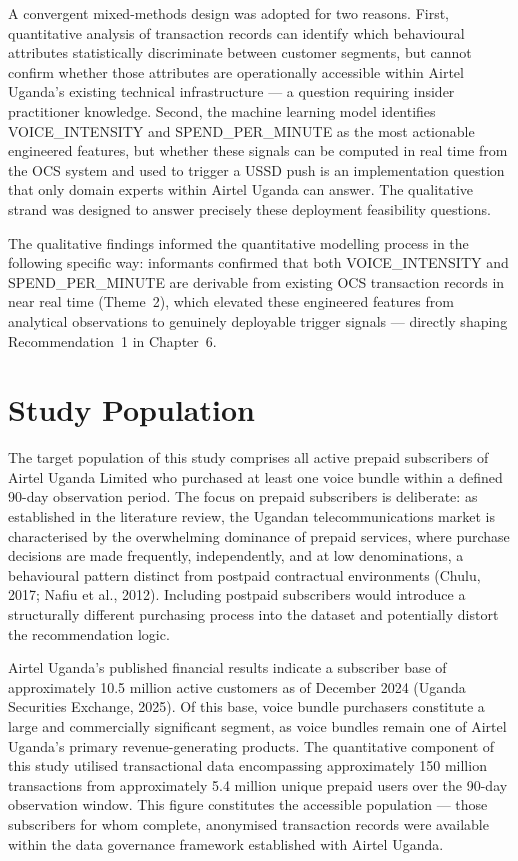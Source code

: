 A convergent mixed-methods design was adopted \cite{ref17} for two reasons.
First, quantitative analysis of transaction records can identify which behavioural
attributes statistically discriminate between customer segments, but cannot confirm
whether those attributes are operationally accessible within Airtel Uganda's
existing technical infrastructure --- a question requiring insider practitioner
knowledge. Second, the machine learning model identifies VOICE\_INTENSITY and
SPEND\_PER\_MINUTE as the most actionable engineered features, but whether these
signals can be computed in real time from the OCS system and used to trigger a
USSD push is an implementation question that only domain experts within Airtel
Uganda can answer. The qualitative strand was designed to answer precisely these
deployment feasibility questions.

The qualitative findings informed the quantitative modelling process in the
following specific way: informants confirmed that both VOICE\_INTENSITY and
\\SPEND\_PER\_MINUTE are derivable from existing OCS transaction records in near
real time (Theme~2), which elevated these engineered features from analytical
observations to genuinely deployable trigger signals --- directly shaping
Recommendation~1 in Chapter~6.

\section{Study Population}

The target population of this study comprises all active prepaid subscribers of Airtel Uganda Limited who purchased at least one voice bundle within a defined 90-day observation period. The focus on prepaid subscribers is deliberate: as established in the literature review, the Ugandan telecommunications market is characterised by the overwhelming dominance of prepaid services, where purchase decisions are made frequently, independently, and at low denominations, a behavioural pattern distinct from postpaid contractual environments (Chulu, 2017; Nafiu et al., 2012). Including postpaid subscribers would introduce a structurally different purchasing process into the dataset and potentially distort the recommendation logic.

Airtel Uganda's published financial results indicate a subscriber base of approximately 10.5 million active customers as of December 2024 (Uganda Securities Exchange, 2025). Of this base, voice bundle purchasers constitute a large and commercially significant segment, as voice bundles remain one of Airtel Uganda's primary revenue-generating products. The quantitative component of this study utilised transactional data encompassing approximately 150 million transactions from approximately 5.4 million unique prepaid users over the 90-day observation window. This figure constitutes the accessible population --- those subscribers for whom complete, anonymised transaction records were available within the data governance framework established with Airtel Uganda.

